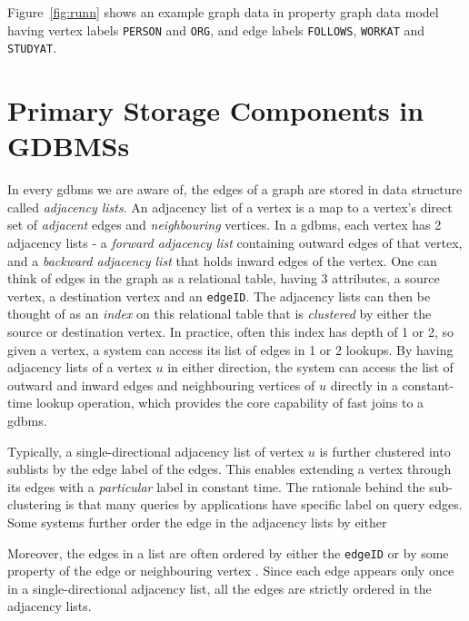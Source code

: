 Figure~\ref{fig:runn} shows an example graph data in property graph data model having vertex labels \texttt{PERSON} and \texttt{ORG}, and edge labels \texttt{FOLLOWS}, \texttt{WORKAT} and \texttt{STUDYAT}. 

\section{Primary Storage Components in GDBMSs}
\label{sec:storage-components}

In every \gls{gdbms} we are aware of, the edges of a graph are stored in data structure called \emph{adjacency lists}. An adjacency list of a vertex is a map to a vertex's direct set of \emph{adjacent} edges and \emph{neighbouring} vertices. In a \gls{gdbms}, each vertex has 2 adjacency lists - a \emph{forward adjacency list} containing outward edges of that vertex, and a \emph{backward adjacency list} that holds inward edges of the vertex. One can think of edges in the graph as a relational table, having 3 attributes, a source vertex, a destination vertex and an \texttt{edgeID}. The adjacency lists can then be thought of as an \emph{index} on this relational table that is \emph{clustered} by either the source or destination vertex. In practice, often this index has depth of 1 or 2, so given a vertex, a system can access its list of edges in 1 or 2 lookups. By having adjacency lists of a vertex $u$ in either direction, the system can access the list of outward and inward edges and neighbouring vertices of $u$ directly in a constant-time lookup operation, which provides the core capability of fast joins to a \gls{gdbms}. 

Typically, a single-directional adjacency list of vertex $u$ is further clustered into sublists by the edge label of the edges. This enables extending a vertex through its edges with a \emph{particular} label in constant time. The rationale behind the sub-clustering is that many queries by applications have specific label on query edges. Some systems further order the edge in the adjacency lists by either 


Moreover, the edges in a list are often ordered by either the \texttt{edgeID} or by some property of the edge or neighbouring vertex \cite{a+indexes}. Since each edge appears only once in a single-directional adjacency list, all the edges are strictly ordered in the adjacency lists.

